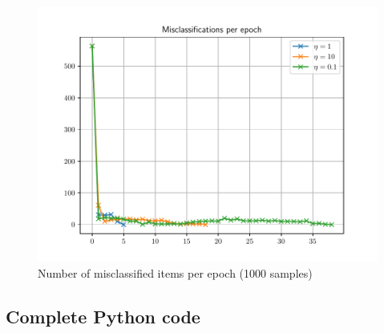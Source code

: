 \documentclass[letterpaper,headings=standardclasses]{scrartcl}
\begin{document}
\begin{figure}[h]
\centering
\includegraphics[width=.7\linewidth]{mclass_per_epoch_1000.pdf}
\caption{Number of misclassified items per epoch (1000 samples)}
\label{mclass_per_epoch_1000}
\end{figure}

\subsection{Complete Python code}


\end{document}
